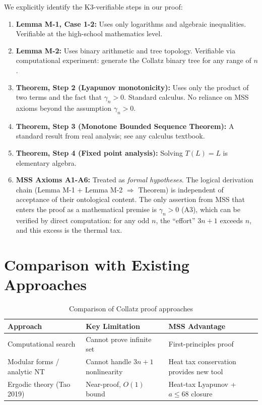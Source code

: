 \documentclass[11pt,a4paper]{article}
\begin{document}
We explicitly identify the K3-verifiable steps in our proof:

\begin{enumerate}[1.]
\item \textbf{Lemma M-1, Case 1-2:} Uses only logarithms and algebraic inequalities. Verifiable at the high-school mathematics level.
\item \textbf{Lemma M-2:} Uses binary arithmetic and tree topology. Verifiable via computational experiment: generate the Collatz binary tree for any range of $n$.
\item \textbf{Theorem, Step 2 (Lyapunov monotonicity):} Uses only the product of two terms and the fact that $\gamma_n > 0$. Standard calculus. No reliance on MSS axioms beyond the assumption $\gamma_n > 0$.
\item \textbf{Theorem, Step 3 (Monotone Bounded Sequence Theorem):} A standard result from real analysis; see any calculus textbook.
\item \textbf{Theorem, Step 4 (Fixed point analysis):} Solving $T(L)=L$ is elementary algebra.
\item \textbf{MSS Axioms A1-A6:} Treated as \emph{formal hypotheses}. The logical derivation chain (Lemma M-1 + Lemma M-2 $\Rightarrow$ Theorem) is independent of acceptance of their ontological content. The only assertion from MSS that enters the proof as a mathematical premise is $\gamma_n > 0$ (A3), which can be verified by direct computation: for any odd $n$, the ``effort'' $3n+1$ exceeds $n$, and this excess is the thermal tax.
\end{enumerate}

\section{Comparison with Existing Approaches}
\label{sec:comparison}

\begin{table}[h]
\centering
\begin{tabular}{|l|l|l|}
\hline
\textbf{Approach} & \textbf{Key Limitation} & \textbf{MSS Advantage} \\
\hline
Computational search & Cannot prove infinite set & First-principles proof \\
Modular forms / analytic NT & Cannot handle $3n+1$ nonlinearity & Heat tax conservation provides new tool \\
Ergodic theory (Tao 2019) & Near-proof, $O(1)$ bound & Heat-tax Lyapunov + $a\le 68$ closure \\
\hline
\end{tabular}
\caption{Comparison of Collatz proof approaches}
\end{table}
\end{document}
